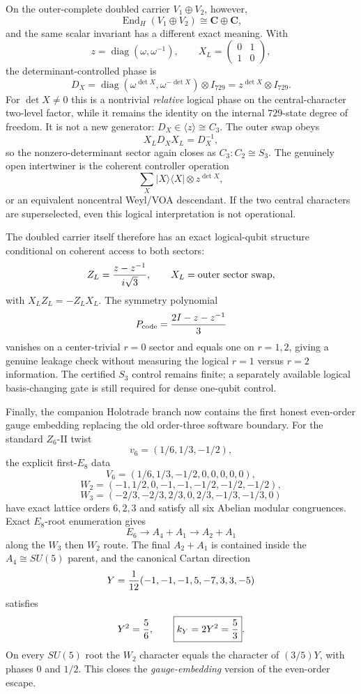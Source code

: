 On the outer-complete doubled carrier \(V_1\oplus V_2\), however,
\[
 \operatorname{End}_{H}(V_1\oplus V_2)\cong\mathbf C\oplus\mathbf C,
\]
and the same scalar invariant has a different exact meaning.  With
\[
 z=\operatorname{diag}(\omega,\omega^{-1}),\qquad
 X_L=\begin{pmatrix}0&1\\1&0\end{pmatrix},
\]
the determinant-controlled phase is
\[
 D_X=\operatorname{diag}(\omega^{\det X},\omega^{-\det X})
      \otimes I_{729}
     =z^{\det X}\otimes I_{729}.
\]
For \(\det X\ne0\) this is a nontrivial \emph{relative} logical phase on the
central-character two-level factor, while it remains the identity on the
internal \(729\)-state degree of freedom.  It is not a new generator:
\(D_X\in\langle z\rangle\cong C_3\).  The outer swap obeys
\[
 X_L D_X X_L=D_X^{-1},
\]
so the nonzero-determinant sector again closes as \(C_3{:}C_2\cong S_3\).
The genuinely open intertwiner is the coherent controller operation
\[
 \sum_X |X\rangle\!\langle X|\otimes z^{\det X},
\]
or an equivalent noncentral Weyl/VOA descendant.  If the two central
characters are superselected, even this logical interpretation is not
operational.

The doubled carrier itself therefore has an exact logical-qubit structure
conditional on coherent access to both sectors:
\[
 Z_L={z-z^{-1}\over i\sqrt3},\qquad X_L=\text{outer sector swap},
\]
with \(X_LZ_L=-Z_LX_L\).  The symmetry polynomial
\[
 P_{\rm code}={2I-z-z^{-1}\over3}
\]
vanishes on a center-trivial \(r=0\) sector and equals one on \(r=1,2\), giving
a genuine leakage check without measuring the logical \(r=1\) versus \(r=2\)
information.  The certified \(S_3\) control remains finite; a separately
available logical basis-changing gate is still required for dense one-qubit
control.

Finally, the companion Holotrade branch now contains the first honest
even-order gauge embedding replacing the old order-three software boundary.
For the standard \(Z_6\)-II twist
\[
 v_6=(1/6,1/3,-1/2),
\]
the explicit first-\(E_8\) data
\[
 V_6=(1/6,1/3,-1/2,0,0,0,0,0),
\]
\[
 W_2=(-1,1/2,0,-1,-1,-1/2,-1/2,-1/2),
\]
\[
 W_3=(-2/3,-2/3,2/3,0,2/3,-1/3,-1/3,0)
\]
have exact lattice orders \(6,2,3\) and satisfy all six Abelian modular
congruences.  Exact \(E_8\)-root enumeration gives
\[
 E_6 \longrightarrow A_4+A_1 \longrightarrow A_2+A_1
\]
along the \(W_3\) then \(W_2\) route.  The final \(A_2+A_1\) is contained
inside the \(A_4\cong SU(5)\) parent, and the canonical Cartan direction
\[
 Y={1\over12}(-1,-1,-1,5,-7,3,3,-5)
\]
satisfies
\[
 Y^2={5\over6},\qquad \boxed{k_Y=2Y^2={5\over3}}.
\]
On every \(SU(5)\) root the \(W_2\) character equals the character of
\((3/5)Y\), with phases \(0\) and \(1/2\).  This closes the
\emph{gauge-embedding} version of the even-order escape.

